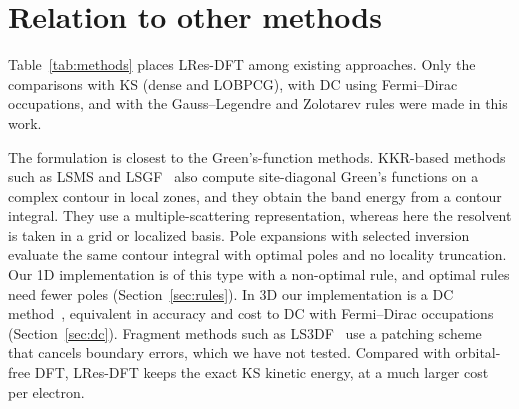 \documentclass[aps,prb,twocolumn,superscriptaddress,floatfix,longbibliography]{revtex4-2}
\theoremstyle{remark}
\begin{document}
\section{Relation to other methods}\label{sec:comparison}

Table~\ref{tab:methods} places LRes-DFT among existing approaches. Only the comparisons with KS (dense and LOBPCG), with DC
using Fermi--Dirac occupations, and with the Gauss--Legendre and Zolotarev rules were made in this work.

The formulation is closest to the Green's-function methods. KKR-based methods such as LSMS and LSGF~\cite{LSMS1995,LSGF1996,Zeller2008}
also compute site-diagonal Green's functions on a complex contour in local zones, and they obtain the band energy from a
contour integral. They use a multiple-scattering representation, whereas here the resolvent is taken in a grid or localized basis. Pole
expansions with selected inversion~\cite{LinLuYingE2009,PEXSI2013} evaluate the same contour integral with optimal poles and
no locality truncation. Our 1D implementation is of this type with a non-optimal rule, and optimal rules need fewer poles
(Section~\ref{sec:rules}). In 3D our implementation is a DC method~\cite{Yang1991}, equivalent in accuracy and cost to DC with
Fermi--Dirac occupations (Section~\ref{sec:dc}). Fragment methods such as LS3DF~\cite{LS3DF2008} use a patching scheme that
cancels boundary errors, which we have not tested. Compared with orbital-free DFT, LRes-DFT keeps the exact KS kinetic
energy, at a much larger cost per electron.
\end{document}
